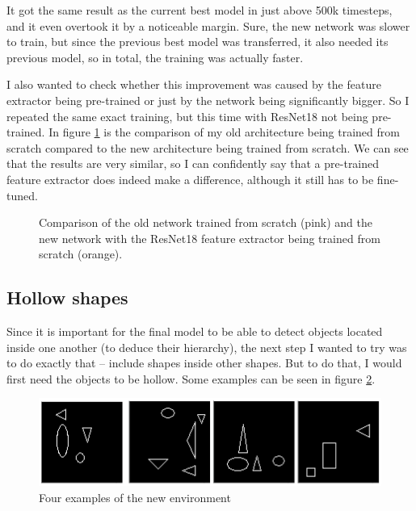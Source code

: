 \documentclass[
  digital,     %
  oneside,     %
  nosansbold,  %
  nocolorbold, %
  lof,         %
  lot,         %
]{fithesis4}
\begin{document}
It got the same result as the current best model in just above 500k timesteps, and it even overtook it by a noticeable margin. Sure, the new network was slower to train, but since the previous best model was transferred, it also needed its previous model, so in total, the training was actually faster.

I also wanted to check whether this improvement was caused by the feature extractor being pre-trained or just by the network being significantly bigger. So I repeated the same exact training, but this time with ResNet18 not being pre-trained. In figure \ref{fig:v4_resnet_from_scratch} is the comparison of my old architecture being trained from scratch compared to the new architecture being trained from scratch. We can see that the results are very similar, so I can confidently say that a pre-trained feature extractor does indeed make a difference, although it still has to be fine-tuned.

\begin{figure}
    \centering
    \makebox[\textwidth][c]{}
    \caption{Comparison of the old network trained from scratch (pink) and the new network with the ResNet18 feature extractor being trained from scratch (orange).}
    \label{fig:v4_resnet_from_scratch}
\end{figure}

\subsection{Hollow shapes}
Since it is important for the final model to be able to detect objects located inside one another (to deduce their hierarchy), the next step I wanted to try was to do exactly that -- include shapes inside other shapes. But to do that, I would first need the objects to be hollow. Some examples can be seen in figure \ref{fig:env5}.

\begin{figure}
    \centering
    \includegraphics[width=1\linewidth]{env_examples/env5.png}
    \caption{Four examples of the new environment}
    \label{fig:env5}
\end{figure}
 
\end{document}
